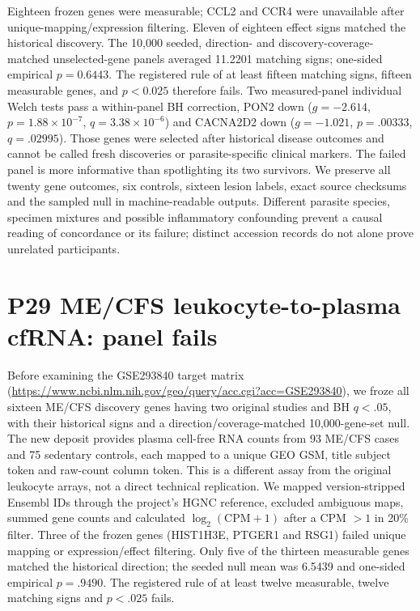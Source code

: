 \documentclass[11pt,a4paper]{article}
\begin{document}
Eighteen frozen genes were measurable; CCL2 and CCR4 were unavailable after unique-mapping/expression filtering. Eleven of eighteen effect signs matched the historical discovery. The 10,000 seeded, direction- and discovery-coverage-matched unselected-gene panels averaged 11.2201 matching signs; one-sided empirical $p=0.6443$. The registered rule of at least fifteen matching signs, fifteen measurable genes, and $p<0.025$ therefore fails. Two measured-panel individual Welch tests pass a within-panel BH correction, PON2 down ($g=-2.614$, $p=1.88\times10^{-7}$, $q=3.38\times10^{-6}$) and CACNA2D2 down ($g=-1.021$, $p=.00333$, $q=.02995$). Those genes were selected after historical disease outcomes and cannot be called fresh discoveries or parasite-specific clinical markers. The failed panel is more informative than spotlighting its two survivors. We preserve all twenty gene outcomes, six controls, sixteen lesion labels, exact source checksums and the sampled null in machine-readable outputs. Different parasite species, specimen mixtures and possible inflammatory confounding prevent a causal reading of concordance or its failure; distinct accession records do not alone prove unrelated participants.

\section{P29 ME/CFS leukocyte-to-plasma cfRNA: panel fails}
Before examining the GSE293840 target matrix (\url{https://www.ncbi.nlm.nih.gov/geo/query/acc.cgi?acc=GSE293840}), we froze all sixteen ME/CFS discovery genes having two original studies and BH $q<.05$, with their historical signs and a direction/coverage-matched 10,000-gene-set null. The new deposit provides plasma cell-free RNA counts from 93 ME/CFS cases and 75 sedentary controls, each mapped to a unique GEO GSM, title subject token and raw-count column token. This is a different assay from the original leukocyte arrays, not a direct technical replication. We mapped version-stripped Ensembl IDs through the project's HGNC reference, excluded ambiguous maps, summed gene counts and calculated $\log_2(\mathrm{CPM}+1)$ after a CPM $>1$ in 20\% filter. Three of the frozen genes (HIST1H3E, PTGER1 and RSG1) failed unique mapping or expression/effect filtering. Only five of the thirteen measurable genes matched the historical direction; the seeded null mean was 6.5439 and one-sided empirical $p=.9490$. The registered rule of at least twelve measurable, twelve matching signs and $p<.025$ fails.
\end{document}
